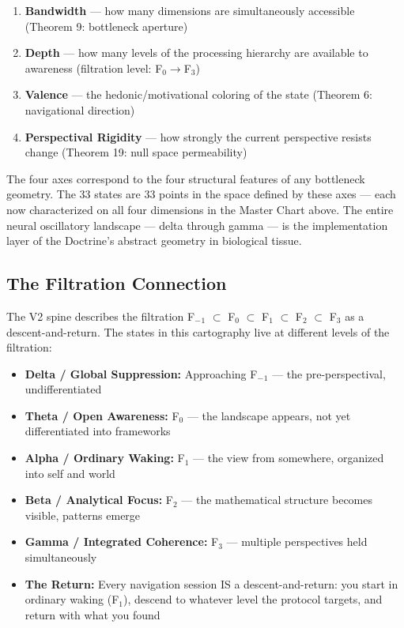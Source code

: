 \begin{enumerate}[nosep,leftmargin=*]
  \item \textbf{Bandwidth} — how many dimensions are simultaneously accessible (Theorem 9: bottleneck aperture)
  \item \textbf{Depth} — how many levels of the processing hierarchy are available to awareness (filtration level: F$_0$$\rightarrow$F$_3$)
  \item \textbf{Valence} — the hedonic/motivational coloring of the state (Theorem 6: navigational direction)
  \item \textbf{Perspectival Rigidity} — how strongly the current perspective resists change (Theorem 19: null space permeability)
\end{enumerate}


The four axes correspond to the four structural features of any bottleneck geometry. The 33 states are 33 points in the space defined by these axes — each now characterized on all four dimensions in the Master Chart above. The entire neural oscillatory landscape — delta through gamma — is the implementation layer of the Doctrine's abstract geometry in biological tissue.


\subsection*{The Filtration Connection}


The V2 spine describes the filtration F$_{-}$$_1$ $\subset$ F$_0$ $\subset$ F$_1$ $\subset$ F$_2$ $\subset$ F$_3$ as a descent-and-return. The states in this cartography live at different levels of the filtration:


\begin{itemize}[nosep,leftmargin=*]
  \item \textbf{Delta / Global Suppression:} Approaching F$_{-}$$_1$ — the pre-perspectival, undifferentiated
  \item \textbf{Theta / Open Awareness:} F$_0$ — the landscape appears, not yet differentiated into frameworks
  \item \textbf{Alpha / Ordinary Waking:} F$_1$ — the view from somewhere, organized into self and world
  \item \textbf{Beta / Analytical Focus:} F$_2$ — the mathematical structure becomes visible, patterns emerge
  \item \textbf{Gamma / Integrated Coherence:} F$_3$ — multiple perspectives held simultaneously
  \item \textbf{The Return:} Every navigation session IS a descent-and-return: you start in ordinary waking (F$_1$), descend to whatever level the protocol targets, and return with what you found
\end{itemize}


